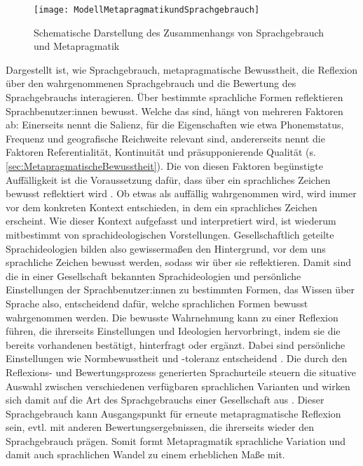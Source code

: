 \begin{figure}
\centering
\texttt{[image: ModellMetapragmatikundSprachgebrauch]}
\caption{Schematische Darstellung des Zusammenhangs von Sprachgebrauch und Metapragmatik}
\label{pic:MetapragmatikundSprachwandel}
\end{figure}
Dargestellt ist, wie Sprachgebrauch, metapragmatische Bewusstheit, die Reflexion über den wahrgenommenen Sprachgebrauch und die Bewertung des Sprachgebrauchs interagieren. 
Über bestimmte sprachliche Formen reflektieren Sprachbenutzer:innen bewusst. 
Welche das sind, hängt von mehreren Faktoren ab: Einerseits nennt \citet[]{Auer2014} die Salienz, für die Eigenschaften wie etwa Phonemstatus, Frequenz und geografische Reichweite relevant sind, andererseits nennt \citet[]{Silverstein.1981} die Faktoren Referentialität, Kontinuität und präsupponierende Qualität (s. \autoref{sec:MetapragmatischeBewusstheit}). 
Die von diesen Faktoren begünstigte Auffälligkeit ist die Voraussetzung dafür, dass über ein sprachliches Zeichen bewusst reflektiert wird \citep[s.][374]{Butterworth.2011}. 
Ob etwas als auffällig wahrgenommen wird, wird immer vor dem konkreten Kontext entschieden, in dem ein sprachliches Zeichen erscheint. 
Wie dieser Kontext aufgefasst und interpretiert wird, ist wiederum mitbestimmt von sprachideologischen Vorstellungen.
Gesellschaftlich geteilte Sprachideologien bilden also gewissermaßen den Hintergrund, vor dem uns sprachliche Zeichen bewusst werden, sodass wir über sie reflektieren.
Damit sind die in einer Gesellschaft bekannten Sprachideologien und persönliche Einstellungen der Sprachbenutzer:innen zu bestimmten Formen, das Wissen über Sprache also, entscheidend dafür, welche sprachlichen Formen bewusst wahrgenommen werden. 
Die bewusste Wahrnehmung kann zu einer Reflexion führen, die ihrerseits Einstellungen und Ideologien hervorbringt, indem sie die bereits vorhandenen bestätigt, hinterfragt oder ergänzt.
Dabei sind persönliche Einstellungen wie Normbewusstheit und -toleranz entscheidend \citep[s.][375]{Butterworth.2011}. 
Die durch den Reflexions- und Bewertungsprozess generierten Sprachurteile \glqq steuern die situative Auswahl zwischen verschiedenen verfügbaren sprachlichen Varianten und wirken sich damit auf die Art des Sprachgebrauchs einer Gesellschaft aus\grqq{} \citep[372]{Butterworth.2011}.
Dieser Sprachgebrauch kann Ausgangspunkt für erneute metapragmatische Reflexion sein, evtl. mit anderen Bewertungsergebnissen, die ihrerseits wieder den Sprachgebrauch prägen. 
Somit formt Metapragmatik sprachliche Variation und damit auch sprachlichen Wandel zu einem erheblichen Maße mit. 
